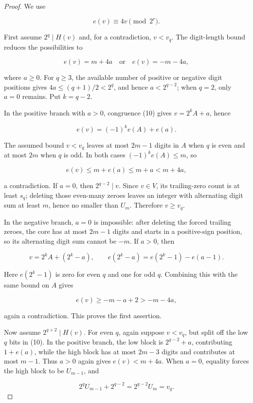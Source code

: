 \documentclass[11pt]{article}
\numberwithin{equation}{section}
\begin{document}
\begin{proof}


We use

\[
e(v)\equiv4v\pmod {2^r}.
\tag{10}
\]

First assume $2^q\mid H(v)$ and, for a contradiction, $v<v_q$. The digit-length bound reduces the
possibilities to

\[
e(v)=m+4a\quad\text{or}\quad e(v)=-m-4a,
\tag{11}
\]

where $a\geq0$. For $q\geq3$, the available number of positive or negative digit positions gives
$4a\leq(q+1)/2<2^q$, and hence $a<2^{q-2}$; when $q=2$, only $a=0$ remains. Put
$k=q-2$.

In the positive branch with $a>0$, congruence (10) gives $v=2^kA+a$, hence

\[
e(v)=(-1)^ke(A)+e(a).
\]

The assumed bound $v<v_q$ leaves at most $2m-1$ digits in $A$ when $q$ is even and at most
$2m$ when $q$ is odd. In both cases $(-1)^ke(A)\leq m$, so

\[
e(v)\leq m+e(a)\leq m+a<m+4a,
\]

a contradiction. If $a=0$, then $2^{q-2}\mid v$. Since $v\in V$, its trailing-zero count is at
least $s_q$; deleting those even-many zeroes leaves an integer with alternating digit sum at least
$m$, hence no smaller than $U_m$. Therefore $v\geq v_q$.

In the negative branch, $a=0$ is impossible: after deleting the forced trailing zeroes, the core
has at most $2m-1$ digits and starts in a positive-sign position, so its alternating digit sum
cannot be $-m$. If $a>0$, then

\[
v=2^kA+(2^k-a),\qquad
e(2^k-a)=e(2^k-1)-e(a-1).
\]

Here $e(2^k-1)$ is zero for even $q$ and one for odd $q$. Combining this with the same bound on
$A$ gives

\[
e(v)\geq-m-a+2>-m-4a,
\]

again a contradiction. This proves the first assertion.

Now assume $2^{q+2}\mid H(v)$. For even $q$, again suppose $v<v_q$, but split off the low $q$
bits in (10). In the positive branch, the low block is $2^{q-2}+a$, contributing $1+e(a)$,
while the high block has at most $2m-3$ digits and contributes at most $m-1$. Thus $a>0$
again gives $e(v)<m+4a$. When $a=0$, equality forces the high block to be $U_{m-1}$, and

\[
2^qU_{m-1}+2^{q-2}=2^{q-2}U_m=v_q.
\]


\end{proof}
\end{document}
